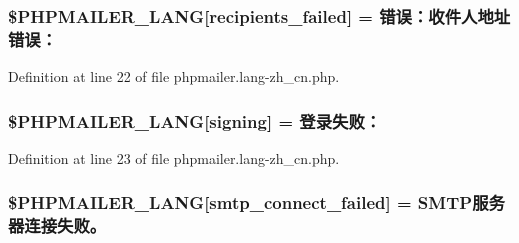 \subsubsection[{\texorpdfstring{\$\+P\+H\+P\+M\+A\+I\+L\+E\+R\+\_\+\+L\+A\+NG}{$PHPMAILER_LANG}}]{\setlength{\rightskip}{0pt plus 5cm}\$P\+H\+P\+M\+A\+I\+L\+E\+R\+\_\+\+L\+A\+NG\mbox{[}\textquotesingle{}recipients\+\_\+failed\textquotesingle{}\mbox{]} =  错误：收件人地址错误：\textquotesingle{}}\hypertarget{phpmailer_8lang-zh__cn_8php_a7589d30bb9b368327c2df015f3e6bcba}{}\label{phpmailer_8lang-zh__cn_8php_a7589d30bb9b368327c2df015f3e6bcba}


Definition at line 22 of file phpmailer.\+lang-\/zh\+\_\+cn.\+php.

\subsubsection[{\texorpdfstring{\$\+P\+H\+P\+M\+A\+I\+L\+E\+R\+\_\+\+L\+A\+NG}{$PHPMAILER_LANG}}]{\setlength{\rightskip}{0pt plus 5cm}\$P\+H\+P\+M\+A\+I\+L\+E\+R\+\_\+\+L\+A\+NG\mbox{[}\textquotesingle{}signing\textquotesingle{}\mbox{]} = \textquotesingle{}登录失败：\textquotesingle{}}\hypertarget{phpmailer_8lang-zh__cn_8php_a68e437bdb9b968a5a67320f03d231565}{}\label{phpmailer_8lang-zh__cn_8php_a68e437bdb9b968a5a67320f03d231565}


Definition at line 23 of file phpmailer.\+lang-\/zh\+\_\+cn.\+php.

\subsubsection[{\texorpdfstring{\$\+P\+H\+P\+M\+A\+I\+L\+E\+R\+\_\+\+L\+A\+NG}{$PHPMAILER_LANG}}]{\setlength{\rightskip}{0pt plus 5cm}\$P\+H\+P\+M\+A\+I\+L\+E\+R\+\_\+\+L\+A\+NG\mbox{[}\textquotesingle{}smtp\+\_\+connect\+\_\+failed\textquotesingle{}\mbox{]} = \textquotesingle{}S\+M\+T\+P服务器连接失败。\textquotesingle{}}\hypertarget{phpmailer_8lang-zh__cn_8php_a7b321d4ca1e9df702403ed4c61aa0980}{}\label{phpmailer_8lang-zh__cn_8php_a7b321d4ca1e9df702403ed4c61aa0980}


